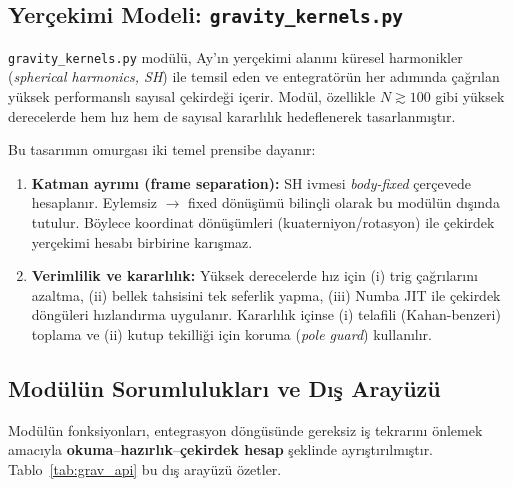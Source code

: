 \newpage
\subsection{Yerçekimi Modeli: \texttt{gravity\_kernels.py}}

\texttt{gravity\_kernels.py} modülü, Ay’ın yerçekimi alanını küresel harmonikler (\emph{spherical harmonics, SH}) ile temsil eden ve entegratörün her adımında çağrılan yüksek performanslı sayısal çekirdeği içerir. Modül, özellikle $N \gtrsim 100$ gibi yüksek derecelerde hem hız hem de sayısal kararlılık hedeflenerek tasarlanmıştır.

Bu tasarımın omurgası iki temel prensibe dayanır:

\begin{enumerate}
  \item \textbf{Katman ayrımı (frame separation):}
  SH ivmesi \emph{body-fixed} çerçevede hesaplanır.
  Eylemsiz $\rightarrow$ fixed dönüşümü bilinçli olarak bu modülün dışında tutulur.
  Böylece koordinat dönüşümleri (kuaterniyon/rotasyon) ile çekirdek yerçekimi hesabı
  birbirine karışmaz.

  \item \textbf{Verimlilik ve kararlılık:}
  Yüksek derecelerde hız için (i) trig çağrılarını azaltma, (ii) bellek tahsisini tek seferlik yapma,
  (iii) Numba JIT ile çekirdek döngüleri hızlandırma uygulanır.
  Kararlılık içinse (i) telafili (Kahan-benzeri) toplama ve (ii) kutup tekilliği için koruma
  (\emph{pole guard}) kullanılır.
\end{enumerate}

\subsection*{Modülün Sorumlulukları ve Dış Arayüzü}

Modülün fonksiyonları, entegrasyon döngüsünde gereksiz iş tekrarını önlemek amacıyla
\textbf{okuma}--\textbf{hazırlık}--\textbf{çekirdek hesap} şeklinde ayrıştırılmıştır.
Tablo~\ref{tab:grav_api} bu dış arayüzü özetler.

